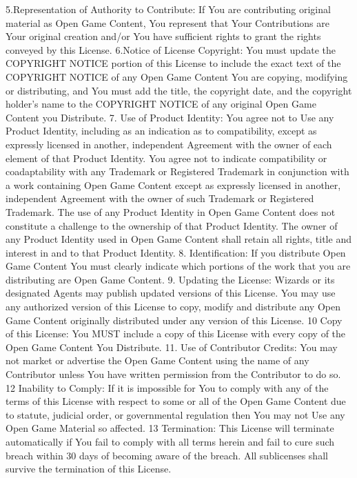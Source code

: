 \begin{multicols}{2}
5.Representation of Authority to Contribute: If
You are contributing original material as Open
Game Content, You represent that Your
Contributions are Your original creation and/or
You have sufficient rights to grant the rights
conveyed by this License.
6.Notice of License Copyright: You must update
the COPYRIGHT NOTICE portion of this License to
include the exact text of the COPYRIGHT NOTICE
of any Open Game Content You are copying,
modifying or distributing, and You must add the
title, the copyright date, and the copyright 
holder's name to the COPYRIGHT NOTICE of any
original Open Game Content you Distribute.
7. Use of Product Identity: You agree not to Use
any Product Identity, including as an indication as
to compatibility, except as expressly licensed in
another, independent Agreement with the owner
of each element of that Product Identity. You
agree not to indicate compatibility or coadaptability with any Trademark or Registered
Trademark in conjunction with a work containing
Open Game Content except as expressly licensed
in another, independent Agreement with the
owner of such Trademark or Registered
Trademark. The use of any Product Identity in
Open Game Content does not constitute a
challenge to the ownership of that Product
Identity. The owner of any Product Identity used
in Open Game Content shall retain all rights, title
and interest in and to that Product Identity.
8. Identification: If you distribute Open Game
Content You must clearly indicate which portions
of the work that you are distributing are Open
Game Content.
9. Updating the License: Wizards or its designated
Agents may publish updated versions of this
License. You may use any authorized version of
this License to copy, modify and distribute any
Open Game Content originally distributed under
any version of this License.
10 Copy of this License: You MUST include a copy
of this License with every copy of the Open Game
Content You Distribute.
11. Use of Contributor Credits: You may not
market or advertise the Open Game Content
using the name of any Contributor unless You
have written permission from the Contributor to
do so.
12 Inability to Comply: If it is impossible for You
to comply with any of the terms of this License
with respect to some or all of the Open Game
Content due to statute, judicial order, or
governmental regulation then You may not Use
any Open Game Material so affected.
13 Termination: This License will terminate
automatically if You fail to comply with all terms
herein and fail to cure such breach within 30 days
of becoming aware of the breach. All sublicenses
shall survive the termination of this License.

\end{multicols}
